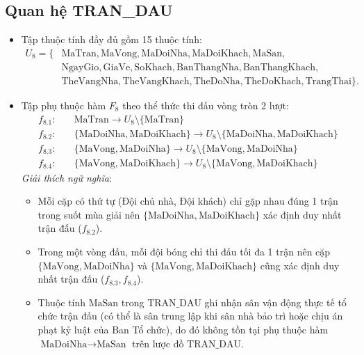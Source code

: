 \subsection{Quan hệ TRAN\_DAU}
\begin{itemize}
    \item Tập thuộc tính đầy đủ gồm 15 thuộc tính:
    \begin{align*}
        U_8 = \{&\text{MaTran}, \text{MaVong}, \text{MaDoiNha}, \text{MaDoiKhach}, \text{MaSan}, \\
                &\text{NgayGio}, \text{GiaVe}, \text{SoKhach}, \text{BanThangNha}, \text{BanThangKhach}, \\
                &\text{TheVangNha}, \text{TheVangKhach}, \text{TheDoNha}, \text{TheDoKhach}, \text{TrangThai}\}.
    \end{align*}
    \item Tập phụ thuộc hàm $F_8$ theo thể thức thi đấu vòng tròn 2 lượt:
    \begin{align*}
        f_{8.1}: & \quad \text{MaTran} \rightarrow U_8 \setminus \{\text{MaTran}\} \\
        f_{8.2}: & \quad \{\text{MaDoiNha}, \text{MaDoiKhach}\} \rightarrow U_8 \setminus \{\text{MaDoiNha}, \text{MaDoiKhach}\} \\
        f_{8.3}: & \quad \{\text{MaVong}, \text{MaDoiNha}\} \rightarrow U_8 \setminus \{\text{MaVong}, \text{MaDoiNha}\} \\
        f_{8.4}: & \quad \{\text{MaVong}, \text{MaDoiKhach}\} \rightarrow U_8 \setminus \{\text{MaVong}, \text{MaDoiKhach}\}
    \end{align*}
    \textit{Giải thích ngữ nghĩa}:
    \begin{itemize}
        \item Mỗi cặp có thứ tự (Đội chủ nhà, Đội khách) chỉ gặp nhau đúng 1 trận trong suốt mùa giải nên $\{\text{MaDoiNha}, \text{MaDoiKhach}\}$ xác định duy nhất trận đấu ($f_{8.2}$).
        \item Trong một vòng đấu, mỗi đội bóng chỉ thi đấu tối đa 1 trận nên cặp $\{\text{MaVong}, \text{MaDoiNha}\}$ và $\{\text{MaVong}, \text{MaDoiKhach}\}$ cũng xác định duy nhất trận đấu ($f_{8.3}, f_{8.4}$).
        \item Thuộc tính $\text{MaSan}$ trong $\text{TRAN\_DAU}$ ghi nhận sân vận động thực tế tổ chức trận đấu (có thể là sân trung lập khi sân nhà bảo trì hoặc chịu án phạt kỷ luật của Ban Tổ chức), do đó không tồn tại phụ thuộc hàm $\text{MaDoiNha} \rightarrow \text{MaSan}$ trên lược đồ $\text{TRAN\_DAU}$.
    \end{itemize}

\end{itemize}
